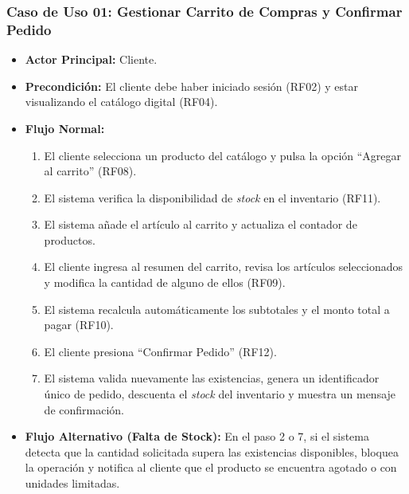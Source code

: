 \subsubsection*{Caso de Uso 01: Gestionar Carrito de Compras y Confirmar Pedido}
\begin{itemize}
    \item \textbf{Actor Principal:} Cliente.
    \item \textbf{Precondición:} El cliente debe haber iniciado sesión (RF02) y estar visualizando el catálogo digital (RF04).
    \item \textbf{Flujo Normal:}
    \begin{enumerate}
        \item El cliente selecciona un producto del catálogo y pulsa la opción ``Agregar al carrito'' (RF08).
        \item El sistema verifica la disponibilidad de \textit{stock} en el inventario (RF11).
        \item El sistema añade el artículo al carrito y actualiza el contador de productos.
        \item El cliente ingresa al resumen del carrito, revisa los artículos seleccionados y modifica la cantidad de alguno de ellos (RF09).
        \item El sistema recalcula automáticamente los subtotales y el monto total a pagar (RF10).
        \item El cliente presiona ``Confirmar Pedido'' (RF12).
        \item El sistema valida nuevamente las existencias, genera un identificador único de pedido, descuenta el \textit{stock} del inventario y muestra un mensaje de confirmación.
    \end{enumerate}
    \item \textbf{Flujo Alternativo (Falta de Stock):} En el paso 2 o 7, si el sistema detecta que la cantidad solicitada supera las existencias disponibles, bloquea la operación y notifica al cliente que el producto se encuentra agotado o con unidades limitadas.
\end{itemize}

